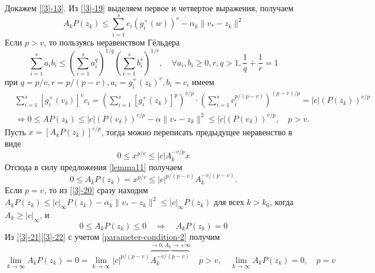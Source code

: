Докажем \eqref{[3]-13}. Из \eqref{[3]-19} выделяем первое и четвертое выражения, получаем 
\begin{equation}
\label{[3]-20}
A_kP(z_k)\leqslant\sum_{i=1}^{s}c_i(g_i^+(w))^v-\alpha_k\|v_*-z_k\|^2
\end{equation} 
Если $p>v$, то пользуясь неравенством Гёльдера
\begin{equation*}
\sum_{i=1}^{s}a_ib_i\leqslant\left(\sum_{i=1}^{s}a_i^q \right)^{1/q}\left(\sum_{i=1}^{s}b_i^r \right)^{1/r},\quad \forall a_i,b_i\geqslant 0,r,q>1,\frac{1}{q}+\frac{1}{r}=1
\end{equation*} 
при $q=p/v,r=p/(p-v),a_i=g_i^+(z_k)^v,b_i=c_i$ имеем
\begin{equation*}
\begin{aligned}
&\sum_{i=1}^{s}[g_i^+(v_{\delta})]^v c_i=\left(\sum_{i=1}^{s}[g_i^+(z_k)]^p \right)^{v/p}\cdot\left(\sum_{i=1}^{s}c_i^{p/(p-v)} \right)^{(p-v)/p}=|c|(P(z_k))^{v/p}\\
&\Rightarrow 0\leqslant AP(z_k)\leqslant |c|(P(v_{\delta}))^{v/p}-\alpha\|v_*-z_k\|^2\leqslant|c|(P(v_{\delta}))^{v/p},\quad p>v.
\end{aligned}
\end{equation*}
Пусть $x=[A_kP(z_k)]^{v/p}$, тогда можно переписать предыдущее неравенство в виде
\begin{equation*}
0\leqslant x^{p/v}\leqslant|c|A_k^{-v/p}x
\end{equation*} 
Отсюда в силу предложения \ref{lemma11} получаем
\begin{equation}
\label{[3]-21}
0\leqslant A_kP(z_k)=x^{p/v}\leqslant|c|^{p/(p-v)}A_k^{-v/(p-v)}.
\end{equation}
Если $p=v$, то из \eqref{[3]-20} сразу находим $A_kP(z_k)\leqslant |c|_{\infty}P(z_k)-\alpha_k\|v_*-z_k\|^2\leqslant |c|_{\infty}P(z_k)$ для всех $k>k_0$, когда $A_k\geqslant |c|_{\infty}$, и
\begin{equation}
\label{[3]-22}
0\leqslant A_kP(z_k)\leqslant 0\quad \Rightarrow\quad A_kP(z_k)=0
\end{equation}
Из \eqref{[3]-21}\eqref{[3]-22} с учетом \eqref{parameter-condition-2} получим
\begin{equation*}
\lim_{k\rightarrow\infty}A_kP(z_k)=0=\lim_{k\rightarrow\infty}|c|^{p/(p-v)}\overbrace{A_k^{-v/(p-v)}}^{\rightarrow 0, A_k\rightarrow+\infty}\quad p>v,\quad\lim_{k\rightarrow\infty}A_kP(z_k)=0,\quad p=v
\end{equation*}

